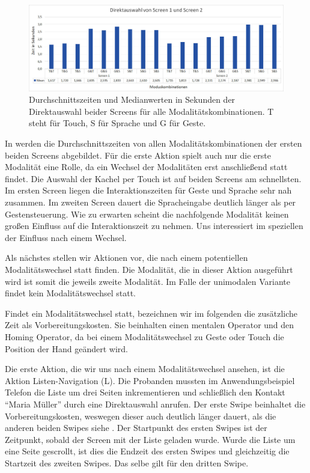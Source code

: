 \begin{figure}[ht]
  \centering
  \includegraphics[width=1\textwidth]{img/DA_Screen12.JPG}
  \caption[Durchschnittszeiten in Sekunden der Direktauswahl]{Durchschnittszeiten und Medianwerten in Sekunden der Direktauswahl beider Screens für alle Modalitätskombinationen. T steht für Touch, S für Sprache und G für Geste.}
  \label{fig:DA_Screen12}
\end{figure}

In  werden die Durchschnittszeiten von allen Modalitätskombinationen der ersten beiden Screens abgebildet. 
Für die erste Aktion spielt auch nur die erste Modalität eine Rolle, da ein Wechsel der Modalitäten erst anschließend statt findet. 
Die Auswahl der Kachel per Touch ist auf beiden Screens am schnellsten. 
Im ersten Screen liegen die Interaktionszeiten für Geste und Sprache sehr nah zusammen. 
Im zweiten Screen dauert die Spracheingabe deutlich länger als per Gestensteuerung.
Wie zu erwarten scheint die nachfolgende Modalität keinen großen Einfluss auf die Interaktionszeit zu nehmen. 
Uns interessiert im speziellen der Einfluss nach einem Wechsel. 

Als nächstes stellen wir Aktionen vor, die nach einem potentiellen Modalitätswechsel statt finden. 
Die Modalität, die in dieser Aktion ausgeführt wird ist somit die jeweils zweite Modalität. 
Im Falle der unimodalen Variante findet kein Modalitätswechsel statt. 

Findet ein Modalitätswechsel statt, bezeichnen wir im folgenden die zusätzliche Zeit als Vorbereitungskosten. 
Sie beinhalten einen mentalen Operator und den Homing Operator, da bei einem Modalitätswechsel zu Geste oder Touch die Position der Hand geändert wird.

Die erste Aktion, die wir uns nach einem Modalitätswechsel ansehen, ist die Aktion Listen-Navigation (L). 
Die Probanden mussten im Anwendungsbeispiel Telefon die Liste um drei Seiten inkrementieren und schließlich den Kontakt "`Maria Müller"' durch eine Direktauswahl anrufen. 
Der erste Swipe beinhaltet die Vorbereitungskosten, weswegen dieser auch deutlich länger dauert, als die anderen beiden Swipes siehe . 
Der Startpunkt des ersten Swipes ist der Zeitpunkt, sobald der Screen mit der Liste geladen wurde. 
Wurde die Liste um eine Seite gescrollt, ist dies die Endzeit des ersten Swipes und gleichzeitig die Startzeit des zweiten Swipes.
Das selbe gilt für den dritten Swipe.

